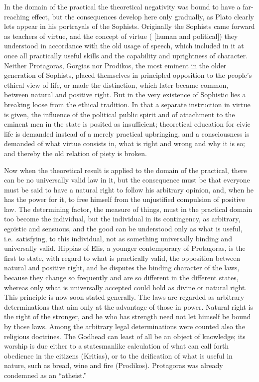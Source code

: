 In the domain of the practical the theoretical negativity was bound to have a
far-reaching effect, but the consequences develop here only gradually, as
Plato clearly lets appear in his portrayals of the Sophists. Originally the
Sophists came forward as teachers of virtue, and the concept of virtue
( [human and political]) they understood in accordance
with the old usage of speech, which included in it at once all practically
useful skills and the capability and uprightness of character. Neither
Protagoras, Gorgias nor Prodikos, the most eminent in the older generation of
Sophists, placed themselves
in principled opposition to the people's ethical view of life, or made the
distinction, which later became common, between natural and positive right.
But in the very existence of Sophistic lies a breaking loose from the ethical
tradition. In that a separate instruction in virtue is given, the influence of
the political public spirit and of attachment to the eminent men in the state
is posited as insufficient; theoretical education for civic life is demanded
instead of a merely practical upbringing, and a consciousness is
demanded of what virtue consists in, what is right and wrong and why it is so;
and thereby the old relation of piety is broken.

Now when the theoretical result is applied to the domain of the practical,
there can be no universally valid law in it, but the consequence must be that
everyone must be said to have a natural right to follow his arbitrary
opinion, and, when he has the power for it, to free himself from the
unjustified compulsion of positive law. The determining factor, the measure
of things, must in the practical domain too become the individual, but the
individual in its contingency, as arbitrary, egoistic and sensuous, and the
good can be understood only as what is useful, i.e.\ satisfying, to this
individual, not as something universally binding and universally valid.
Hippias of Elis, a younger contemporary of Protagoras, is the first to state,
with regard to what is practically valid, the opposition between natural and
positive right, and he disputes the binding character of the laws, because
they change so frequently and are so different in the different states,
whereas only what is universally accepted could hold as divine or natural
right. This principle is now soon stated generally. The laws are regarded as
arbitrary determinations that aim only at the advantage of those in power.
Natural right is the right of the stronger, and he who has strength need not
let himself be bound by those laws. Among the arbitrary legal determinations
were counted also the religious doctrines. The Godhead can least of all be an
object of knowledge; its worship is due either to a statesmanlike calculation
of what can call forth obedience in the citizens (Kritias), or to the
deification of what is useful in nature, such as bread, wine and fire
(Prodikos). Protagoras was already condemned as an ``atheist.''

